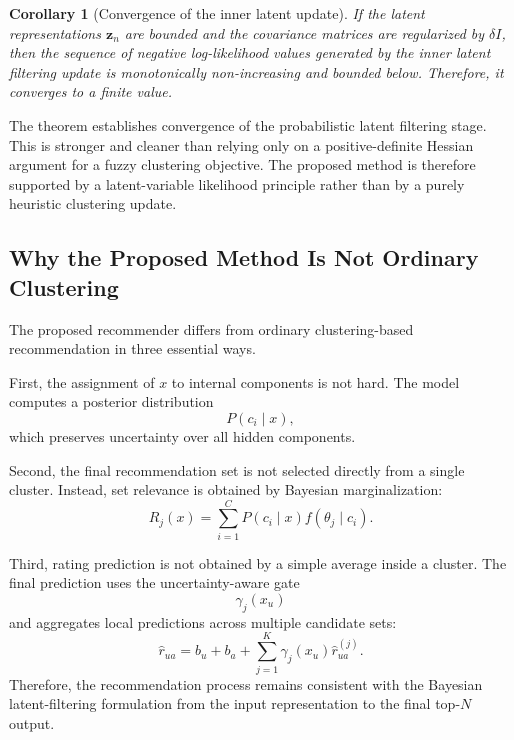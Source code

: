 \documentclass{article}
\theoremstyle{plain}
\newtheorem{corollary}{Corollary}      %
\theoremstyle{definition}
\theoremstyle{remark}
\begin{document}
\begin{corollary}[Convergence of the inner latent update]
	\label{cor:inner_convergence}
	If the latent representations \(\mathbf z_n\) are bounded and the covariance matrices are regularized by \(\delta I\), then the sequence of negative log-likelihood values generated by the inner latent filtering update is monotonically non-increasing and bounded below. Therefore, it converges to a finite value.
\end{corollary}

The theorem establishes convergence of the probabilistic latent filtering stage. This is stronger and cleaner than relying only on a positive-definite Hessian argument for a fuzzy clustering objective. The proposed method is therefore supported by a latent-variable likelihood principle rather than by a purely heuristic clustering update.

\subsection{Why the Proposed Method Is Not Ordinary Clustering}
\label{subsec:not_ordinary_clustering}

The proposed recommender differs from ordinary clustering-based recommendation in three essential ways.

First, the assignment of \(x\) to internal components is not hard. The model computes a posterior distribution
\[
P(c_i\mid x),
\]
which preserves uncertainty over all hidden components.

Second, the final recommendation set is not selected directly from a single cluster. Instead, set relevance is obtained by Bayesian marginalization:
\[
R_j(x)
=
\sum_{i=1}^{C}
P(c_i\mid x)f(\theta_j\mid c_i).
\]

Third, rating prediction is not obtained by a simple average inside a cluster. The final prediction uses the uncertainty-aware gate
\[
\gamma_j(x_u)
\]
and aggregates local predictions across multiple candidate sets:
\[
\widehat r_{ua}
=
b_u+b_a+
\sum_{j=1}^{K}
\gamma_j(x_u)\widehat r_{ua}^{(j)}.
\]
Therefore, the recommendation process remains consistent with the Bayesian latent-filtering formulation from the input representation to the final top-\(N\) output.
\end{document}
